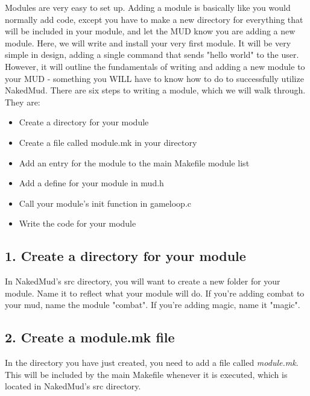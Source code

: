 \documentclass[fignum,doc]{article}
\begin{document}
\begin{doublespace}
Modules are very easy to set up. Adding a module is basically like you would normally add code, except you have to make a new directory for everything that will be included in your module, and let the MUD know you are adding a new module. Here, we will write and install your very first module. It will be very simple in design, adding a single command that sends "hello world" to the user. However, it will outline the fundamentals of writing and adding a new module to your MUD - something you WILL have to know how to do to successfully utilize NakedMud. There are six steps to writing a module, which we will walk through. They are:

\begin{itemize}
\item Create a directory for your module
\item Create a file called module.mk in your directory
\item Add an entry for the module to the main Makefile module list
\item Add a define for your module in mud.h
\item Call your module's init function in gameloop.c
\item Write the code for your module
\end{itemize}



\subsection{1. Create a directory for your module}
In NakedMud's src directory, you will want to create a new folder for your module. Name it to reflect what your module will do. If you're adding combat to your mud, name the module "combat". If you're adding magic, name it "magic".



\subsection{2. Create a module.mk file}
In the directory you have just created, you need to add a file called {\it module.mk}. This will be included by the main Makefile whenever it is executed, which is located in NakedMud's src directory. 


\end{doublespace}
\end{document}
